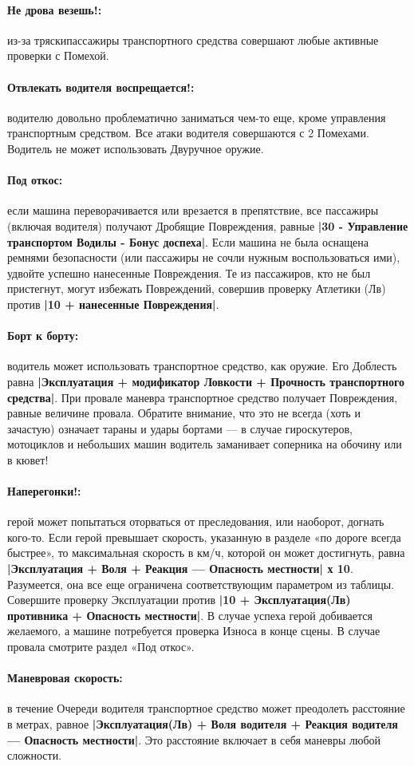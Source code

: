 \paragraph{Не дрова везешь!:} из-за тряскипассажиры транспортного средства совершают любые активные проверки с Помехой.
\paragraph{Отвлекать водителя воспрещается!:} водителю довольно проблематично заниматься чем-то еще, кроме управления транспортным средством. Все атаки водителя совершаются с 2 Помехами. Водитель не может использовать Двуручное оружие.
\paragraph{Под откос:} если машина переворачивается или врезается в препятствие, все пассажиры (включая водителя) получают Дробящие Повреждения, равные \textbf{|30 - Управление транспортом Водилы - Бонус доспеха|}. Если машина не была оснащена ремнями безопасности (или пассажиры не сочли нужным воспользоваться ими), удвойте успешно нанесенные Повреждения.
\newline
Те из пассажиров, кто не был пристегнут, могут избежать Повреждений, совершив проверку Атлетики (Лв) против \textbf{|10 + нанесенные Повреждения|}.
\paragraph{Борт к борту:} водитель может использовать транспортное средство, как оружие. Его Доблесть равна \textbf{|Эксплуатация + модификатор Ловкости + Прочность транспортного средства|}. При провале маневра транспортное средство получает Повреждения, равные величине провала. Обратите внимание, что это не всегда (хоть и зачастую) означает тараны и удары бортами — в случае гироскутеров, мотоциклов и небольших машин водитель заманивает соперника на обочину или в кювет!
\paragraph{Наперегонки!:} герой может попытаться оторваться от преследования, или наоборот, догнать кого-то. Если герой превышает скорость, указанную в разделе «по дороге всегда быстрее», то максимальная скорость в км/ч, которой он может достигнуть, равна \textbf{|Эксплуатация + Воля + Реакция — Опасность местности| х 10}. Разумеется, она все еще ограничена соответствующим параметром из таблицы. Совершите проверку Эксплуатации против \textbf{|10 + Эксплуатация(Лв) противника + Опасность местности|}. В случае успеха герой добивается желаемого, а машине потребуется проверка Износа в конце сцены. В случае провала смотрите раздел «Под откос».
\paragraph{Маневровая скорость:} в течение Очереди водителя транспортное средство может преодолеть расстояние в метрах, равное \textbf{|Эксплуатация(Лв) + Воля водителя + Реакция водителя — Опасность местности|}. Это расстояние включает в себя маневры любой сложности.